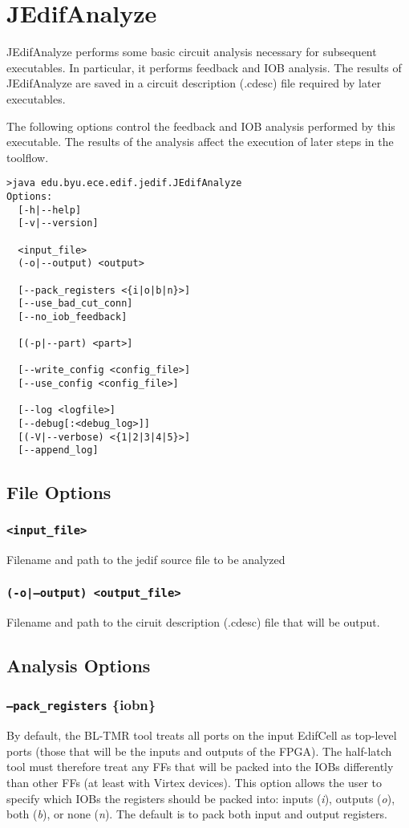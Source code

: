 \section{JEdifAnalyze}
JEdifAnalyze performs some basic circuit analysis necessary for
subsequent executables. In particular, it performs feedback and IOB
analysis. The results of JEdifAnalyze are saved in a circuit
description (.cdesc) file required by later executables.

The following options control the feedback and IOB analysis
performed by this executable. The results of the analysis
affect the execution of later steps in the toolflow.

\begin{verbatim}
>java edu.byu.ece.edif.jedif.JEdifAnalyze
Options:
  [-h|--help]
  [-v|--version]

  <input_file>
  (-o|--output) <output>

  [--pack_registers <{i|o|b|n}>]
  [--use_bad_cut_conn]
  [--no_iob_feedback]

  [(-p|--part) <part>]

  [--write_config <config_file>]
  [--use_config <config_file>]

  [--log <logfile>]
  [--debug[:<debug_log>]]
  [(-V|--verbose) <{1|2|3|4|5}>]
  [--append_log]
\end{verbatim}

\subsection{File Options}

\subsubsection{\texttt{<input\_file>}}
Filename and path to the jedif source file to be analyzed

\subsubsection{\texttt{(-o|--output) <output\_file>}}
Filename and path to the ciruit description (.cdesc) file that will be
output.

\subsection{Analysis Options}
\subsubsection{\texttt{--pack\_registers} \{i\textbar o\textbar b\textbar n\}}
By default, the BL-TMR tool treats all ports on the input EdifCell as top-level
ports (those that will be the inputs and outputs of the FPGA). The half-latch 
tool must therefore treat any FFs that will be packed into the IOBs differently
than other FFs (at least with Virtex devices). This option allows the user to
specify which IOBs the registers should be packed into: inputs (\emph{i}),
outputs (\emph{o}), both (\emph{b}), or none (\emph{n}). The default is to pack
both input and output registers.

